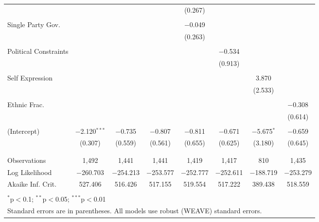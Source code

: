 \documentclass[a4paper]{article}\usepackage[]{graphicx}\usepackage[]{color}
\begin{document}
\begin{table}
\begin{center}
{\begin{tabular}{@{\extracolsep{5pt}}lccccccc}
  &  &  &  & (0.267) &  &  &  \\ 
  & & & & & & & \\ 
 Single Party Gov. &  &  &  & $-$0.049 &  &  &  \\ 
  &  &  &  & (0.263) &  &  &  \\ 
  & & & & & & & \\ 
 Political Constraints &  &  &  &  & $-$0.534 &  &  \\ 
  &  &  &  &  & (0.913) &  &  \\ 
  & & & & & & & \\ 
 Self Expression &  &  &  &  &  & 3.870 &  \\ 
  &  &  &  &  &  & (2.533) &  \\ 
  & & & & & & & \\ 
 Ethnic Frac. &  &  &  &  &  &  & $-$0.308 \\ 
  &  &  &  &  &  &  & (0.614) \\ 
  & & & & & & & \\ 
 (Intercept) & $-$2.120$^{***}$ & $-$0.735 & $-$0.807 & $-$0.811 & $-$0.671 & $-$5.675$^{*}$ & $-$0.659 \\ 
  & (0.307) & (0.559) & (0.561) & (0.655) & (0.625) & (3.180) & (0.645) \\ 
  & & & & & & & \\ 
\hline \\[-1.8ex] 
Observations & 1,492 & 1,441 & 1,441 & 1,419 & 1,417 & 810 & 1,435 \\ 
Log Likelihood & $-$260.703 & $-$254.213 & $-$253.577 & $-$252.777 & $-$252.611 & $-$188.719 & $-$253.279 \\ 
Akaike Inf. Crit. & 527.406 & 516.426 & 517.155 & 519.554 & 517.222 & 389.438 & 518.559 \\ 
\hline 
\hline \\[-1.8ex] 
\multicolumn{8}{l}{$^{*}$p$<$0.1; $^{**}$p$<$0.05; $^{***}$p$<$0.01} \\ 
\multicolumn{8}{l}{Standard errors are in parentheses. All models use robust (WEAVE) standard errors.} \\ 
\end{tabular} 

}
\end{center}
\end{table}
\end{document}
